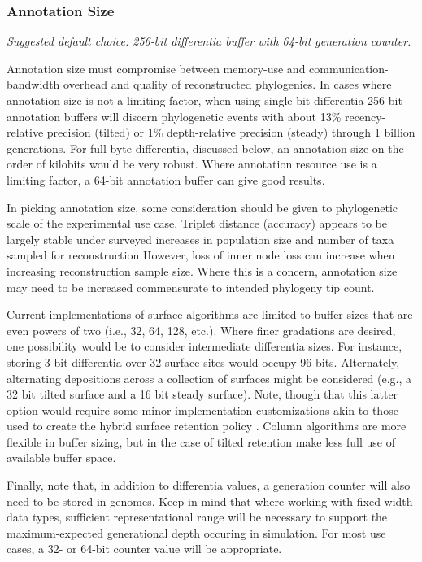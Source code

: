 \subsubsection{Annotation Size}
\textit{Suggested default choice: 256-bit differentia buffer with 64-bit generation counter.}

Annotation size must compromise between memory-use and communication-bandwidth overhead and quality of reconstructed phylogenies.
In cases where annotation size is not a limiting factor, when using single-bit differentia 256-bit annotation buffers will discern phylogenetic events with about 13\% recency-relative precision (tilted) or 1\% depth-relative precision (steady) through 1 billion generations.
For full-byte differentia, discussed below, an annotation size on the order of kilobits would be very robust.
Where annotation resource use is a limiting factor, a 64-bit annotation buffer can give good results.

In picking annotation size, some consideration should be given to phylogenetic scale of the experimental use case.
Triplet distance (accuracy) appears to be largely stable under surveyed increases in population size and number of taxa sampled for reconstruction
However, loss of inner node loss can increase when increasing reconstruction sample size.
Where this is a concern, annotation size may need to be increased commensurate to intended phylogeny tip count.

Current implementations of surface algorithms are limited to buffer sizes that are even powers of two (i.e., 32, 64, 128, etc.).
Where finer gradations are desired, one possibility would be to consider intermediate differentia sizes.
For instance, storing 3 bit differentia over 32 surface sites would occupy 96 bits.
Alternately, alternating depositions across a collection of surfaces might be considered (e.g., a 32 bit tilted surface and a 16 bit steady surface).
Note, though that this latter option would require some minor implementation customizations akin to those used to create the hybrid surface retention policy \citep{moreno2024hsurf}.
Column algorithms are more flexible in buffer sizing, but in the case of tilted retention make less full use of available buffer space.

Finally, note that, in addition to differentia values, a generation counter will also need to be stored in genomes.
Keep in mind that where working with fixed-width data types, sufficient representational range will be necessary to support the maximum-expected generational depth occuring in simulation.
For most use cases, a 32- or 64-bit counter value will be appropriate.

